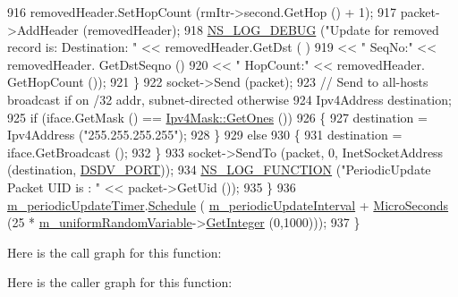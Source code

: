\begin{DoxyCode}
916           removedHeader.SetHopCount (rmItr->second.GetHop () + 1);
917           packet->AddHeader (removedHeader);
918           \hyperlink{group__logging_ga413f1886406d49f59a6a0a89b77b4d0a}{NS\_LOG\_DEBUG} (\textcolor{stringliteral}{"Update for removed record is: Destination: "} << removedHeader.GetDst (
      )
919                                                                       << \textcolor{stringliteral}{" SeqNo:"} << removedHeader.
      GetDstSeqno ()
920                                                                       << \textcolor{stringliteral}{" HopCount:"} << removedHeader.
      GetHopCount ());
921         \}
922       socket->Send (packet);
923       \textcolor{comment}{// Send to all-hosts broadcast if on /32 addr, subnet-directed otherwise}
924       Ipv4Address destination;
925       \textcolor{keywordflow}{if} (iface.GetMask () == \hyperlink{classns3_1_1Ipv4Mask_af712cbdf28c039025d4aa45fa7e243dd}{Ipv4Mask::GetOnes} ())
926         \{
927           destination = Ipv4Address (\textcolor{stringliteral}{"255.255.255.255"});
928         \}
929       \textcolor{keywordflow}{else}
930         \{
931           destination = iface.GetBroadcast ();
932         \}
933       socket->SendTo (packet, 0, InetSocketAddress (destination, \hyperlink{classns3_1_1dsdv_1_1RoutingProtocol_a14b063286a3c34efb9537f6456af3271}{DSDV\_PORT}));
934       \hyperlink{log-macros-disabled_8h_a90b90d5bad1f39cb1b64923ea94c0761}{NS\_LOG\_FUNCTION} (\textcolor{stringliteral}{"PeriodicUpdate Packet UID is : "} << packet->GetUid ());
935     \}
936   \hyperlink{classns3_1_1dsdv_1_1RoutingProtocol_a851fbb5569e6681fd1c42f47d2a79ee8}{m\_periodicUpdateTimer}.\hyperlink{classns3_1_1Timer_ac3345d696887578f518b19f359f7f94b}{Schedule} (
      \hyperlink{classns3_1_1dsdv_1_1RoutingProtocol_a1951a29aaca9beebdff3abd5c7d00ef0}{m\_periodicUpdateInterval} + \hyperlink{group__timecivil_ga17465a639c8d1464e76538afdd78a9f0}{MicroSeconds} (25 * 
      \hyperlink{classns3_1_1dsdv_1_1RoutingProtocol_a2d5efde0680b47457d0b94d0493c9eec}{m\_uniformRandomVariable}->\hyperlink{classns3_1_1RandomVariableStream_a66cd94e6305ce7f000f1a9ff0fcb9aef}{GetInteger} (0,1000)));
937 \}
\end{DoxyCode}


Here is the call graph for this function\+:




Here is the caller graph for this function\+:


